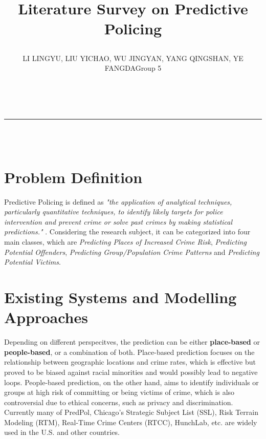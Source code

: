 \documentclass{article}
\title{\raggedright Literature Survey on Predictive Policing}
\author{\raggedright \small{LI LINGYU, LIU YICHAO, WU JINGYAN, YANG QINGSHAN, YE FANGDA}\hfill \small{Group 5}}
\date{}
\begin{document}
\makeatletter
\begin{flushleft}
    {\LARGE \@title} \\[0em] %
    \rule{\textwidth}{1pt} \\[0.5em] %
    {\large \@author} \\[0.5em] %
\end{flushleft}
\makeatother

\section{Problem Definition}
Predictive Policing is defined as \textit{"the application of analytical techniques, particularly quantitative techniques, to identify likely targets for police intervention and prevent crime or solve past crimes by making statistical predictions."} \cite{RAND2013}. Considering the research subject, it can be categorized into four main classes, which are 
\textit{Predicting Places of Increased Crime Risk}, \textit{Predicting Potential Offenders}, \textit{Predicting Group/Population Crime Patterns} and \textit{Predicting Potential Victims}. 


\section{Existing Systems and Modelling Approaches}
Depending on different perspecitves, the prediction can be either \textbf{place-based} or \textbf{people-based}, or a combination of both. Place-based prediction focuses on the relationship between geographic locations and crime rates, which is effective but proved to be biased against racial minorities and would possibly lead to negative loops\cite{brantingham2018biased}. People-based prediction, on the other hand, aims to identify individuals or groups at high risk of committing or being victims of crime, which is also controversial due to ethical concerns, such as privacy and discrimination. Currently many of  PredPol\cite{ferguson2017rise,ensign2017runaway}, Chicago's Strategic Subject List (SSL)\cite{tayebi2016social}, Risk Terrain Modeling (RTM)\cite{caplan2011risk}, Real-Time Crime Centers (RTCC)\cite{ratcliffe2011philadelphia}, HunchLab\cite{hunchlab_ratcliffe_philadelphia_2019}, etc. are widely used in the U.S. and other countries.
\end{document}
